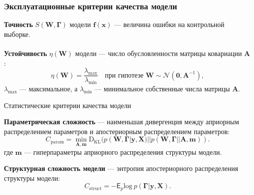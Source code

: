 \documentclass[usenames,dvipsnames,11pt,pdf,utf8,russian,aspectratio=169]{beamer}
\begin{document}
\begin{frame}
\frametitle{Эксплуатационные критерии качества модели}

\textbf{Точность} $S(\mathbf{W}, \boldsymbol{\Gamma})$ модели $\mathbf{f}(\mathbf{x})$ --- величина ошибки на контрольной выборке.
~\\
~\\
\textbf{Устойчивость} $\eta(\mathbf{{W}})$ модели   --- число обусловленности матрицы ковариации $\mathbf{A}$:
$$\eta(\mathbf{{W}})=\frac{\lambda_{\max}}{\lambda_{\min}} \quad\text{при гипотезе } 	\mathbf{W} \sim \mathcal{N}(\mathbf{0},\mathbf{A}^{-1}),$$  $\lambda_{\max}$ --- максимальное, а $\lambda_{\min}$ --- минимальное собственные числа матрицы $\mathbf{A}$.





\end{frame}

\begin{frame}{Статистические критерии качества модели}
\small


\textbf{Параметрическая сложность} --- наименьшая дивергенция между априорным распределением параметров и апостериорным распределением параметров:
\[
    C_\text{param} = \min_{\mathbf{A}, \mathbf{m}} \text{D}_\text{KL}(p(\mathbf{W}, \boldsymbol{\Gamma}|\mathbf{y}, \mathbf{X})||p(\mathbf{W}, \boldsymbol{\Gamma}||\mathbf{A}, \mathbf{m})).
\]
где $\mathbf{m}$ --- гиперпараметры априорного распределения структуры модели.


\textbf{Структурная сложность модели} --- энтропия апостериорного распределения структуры модели:
\[
    C_\text{struct} = -\mathsf{E}_{p} \text{log}~p(\boldsymbol{\Gamma}|\mathbf{y}, \mathbf{X}).
\]

\end{frame}
\end{document}

